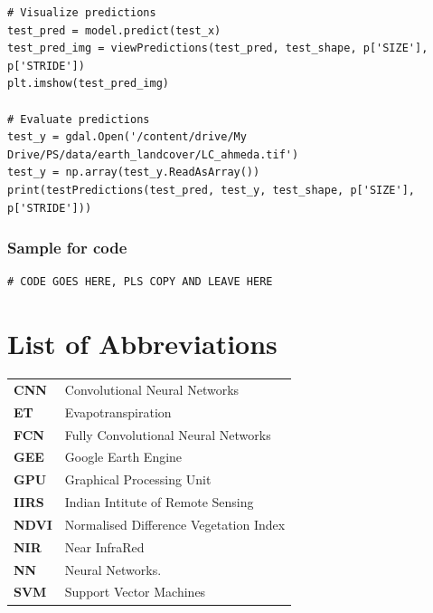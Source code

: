 \documentclass[12pt, a4paper]{report}
\begin{document}
\begin{verbatim}
# Visualize predictions
test_pred = model.predict(test_x)
test_pred_img = viewPredictions(test_pred, test_shape, p['SIZE'], p['STRIDE'])
plt.imshow(test_pred_img)

# Evaluate predictions
test_y = gdal.Open('/content/drive/My Drive/PS/data/earth_landcover/LC_ahmeda.tif')
test_y = np.array(test_y.ReadAsArray())
print(testPredictions(test_pred, test_y, test_shape, p['SIZE'], p['STRIDE']))
\end{verbatim}

\subsubsection*{Sample for code}
\begin{verbatim}
# CODE GOES HERE, PLS COPY AND LEAVE HERE
\end{verbatim}


\printbibliography[heading=bibintoc, title={References}]

\setcounter{secnumdepth}{0}
\section*{List of Abbreviations}
\vspace*{0.5cm}
\begin{tabular}{p{} p{}}
\textbf{CNN} & Convolutional Neural Networks\\
\textbf{ET} & Evapotranspiration\\
\textbf{FCN} & Fully Convolutional Neural Networks\\
\textbf{GEE} & Google Earth Engine\\
\textbf{GPU} & Graphical Processing Unit\\
\textbf{IIRS} & Indian Intitute of Remote Sensing\\
\textbf{NDVI} & Normalised Difference Vegetation Index\\
\textbf{NIR} & Near InfraRed\\
\textbf{NN} & Neural Networks.\\
\textbf{SVM} & Support Vector Machines\\
\end{tabular}
\vspace*{1cm}

\end{document}
